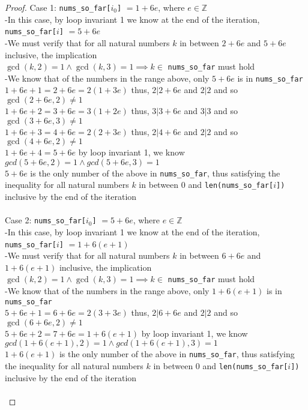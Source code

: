 \documentclass[fontsize=11pt]{article}
\newcommand{\Z}{\mathbb{Z}}
\begin{document}
\begin{enumerate}
\begin{enumerate}
\begin{proof}
Case 1: \texttt{nums\_so\_far[$i_0$]} $= 1 + 6e$, where $ e \in \Z$ \\
-In this case, by loop invariant 1 we know at the end of the iteration, \texttt{nums\_so\_far[$i$]} $= 5 + 6e$ \\
-We must verify that for all natural numbers $k$ in between $2 + 6e$ and $5 + 6e$ inclusive, the implication \\ $\gcd(k, 2) = 1 \wedge \gcd(k, 3) = 1 \implies k \in$ \texttt{nums\_so\_far} must hold \\
-We know that of the numbers in the range above, only $5 + 6e$ is in \texttt{nums\_so\_far} \\
$1 + 6e + 1 = 2 + 6e = 2(1 + 3e)$ thus, $2|2 + 6e$ and $2|2$ and so $\gcd(2 + 6e, 2) \neq 1$ \\
$1 + 6e + 2 = 3 + 6e = 3(1 + 2e)$ thus, $3|3 + 6e$ and $3|3$ and so $\gcd(3 + 6e, 3) \neq 1$ \\
$1 + 6e + 3 = 4 + 6e = 2(2 + 3e)$ thus, $2|4 + 6e$ and $2|2$ and so $\gcd(4 + 6e, 2) \neq 1$ \\
$1 + 6e + 4 = 5 + 6e$ by loop invariant 1, we know $gcd(5 + 6e, 2) = 1 \wedge gcd(5 + 6e, 3) = 1$ \\
$5 + 6e$ is the only number of the above in \texttt{nums\_so\_far}, thus satisfying the inequality for all natural numbers $k$ in between 0 and \texttt{len(nums\_so\_far[$i$])} inclusive by the end of the iteration\\~\\

Case 2: \texttt{nums\_so\_far[$i_0$]} $= 5 + 6e$, where $ e \in \Z$ \\
-In this case, by loop invariant 1 we know at the end of the iteration, \texttt{nums\_so\_far[$i$]} $= 1 + 6(e + 1)$ \\
-We must verify that for all natural numbers $k$ in between $6 + 6e$ and $1 + 6(e + 1)$ inclusive, the implication \\ $\gcd(k, 2) = 1 \wedge \gcd(k, 3) = 1 \implies k \in$ \texttt{nums\_so\_far} must hold \\
-We know that of the numbers in the range above, only $1 + 6(e + 1)$ is in \texttt{nums\_so\_far} \\
$5 + 6e + 1 = 6 + 6e = 2(3 + 3e)$ thus, $2|6 + 6e$ and $2|2$ and so $\gcd(6 + 6e, 2) \neq 1$ \\
$5 + 6e + 2 = 7 + 6e = 1 + 6(e + 1)$ by loop invariant 1, we know $gcd(1 + 6(e + 1), 2) = 1 \wedge gcd(1 + 6(e + 1), 3) = 1$ \\
$1 + 6(e + 1)$ is the only number of the above in \texttt{nums\_so\_far}, thus satisfying the inequality for all natural numbers $k$ in between 0 and \texttt{len(nums\_so\_far[$i$])} inclusive by the end of the iteration \\~\\


\end{proof}
\end{enumerate}
\end{enumerate}
\end{document}
